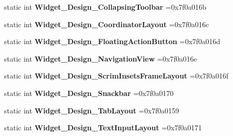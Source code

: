 \begin{DoxyCompactItemize}
\mbox{\label{classandroid_1_1support_1_1v4_1_1R_1_1style_ac57ef044d125ca308bc8647a7d2d7271}} 
static int {\bfseries Widget\+\_\+\+Design\+\_\+\+Collapsing\+Toolbar} =0x7f0a016b
\item 
\mbox{\label{classandroid_1_1support_1_1v4_1_1R_1_1style_a01fd29e23dfab7747aa364b180c1c86d}} 
static int {\bfseries Widget\+\_\+\+Design\+\_\+\+Coordinator\+Layout} =0x7f0a016c
\item 
\mbox{\label{classandroid_1_1support_1_1v4_1_1R_1_1style_a96bc24fc3922c9f6fa34b8385a12de4c}} 
static int {\bfseries Widget\+\_\+\+Design\+\_\+\+Floating\+Action\+Button} =0x7f0a016d
\item 
\mbox{\label{classandroid_1_1support_1_1v4_1_1R_1_1style_ab64857f6ead61a358bb273b4f53f3727}} 
static int {\bfseries Widget\+\_\+\+Design\+\_\+\+Navigation\+View} =0x7f0a016e
\item 
\mbox{\label{classandroid_1_1support_1_1v4_1_1R_1_1style_ab1b53106295abac9313ff0c592e167dd}} 
static int {\bfseries Widget\+\_\+\+Design\+\_\+\+Scrim\+Insets\+Frame\+Layout} =0x7f0a016f
\item 
\mbox{\label{classandroid_1_1support_1_1v4_1_1R_1_1style_a4401c36a52bb3961196c5e8c15cc4518}} 
static int {\bfseries Widget\+\_\+\+Design\+\_\+\+Snackbar} =0x7f0a0170
\item 
\mbox{\label{classandroid_1_1support_1_1v4_1_1R_1_1style_a22d0d627178bb05bb117901b3e3cb3c1}} 
static int {\bfseries Widget\+\_\+\+Design\+\_\+\+Tab\+Layout} =0x7f0a0159
\item 
\mbox{\label{classandroid_1_1support_1_1v4_1_1R_1_1style_ad41e70f321536069c66b856b2e8784d4}} 
static int {\bfseries Widget\+\_\+\+Design\+\_\+\+Text\+Input\+Layout} =0x7f0a0171
\item 
\mbox{\label{classandroid_1_1support_1_1v4_1_1R_1_1style_a9707242edf586794fe0dbc215544fb79}} 

\end{DoxyCompactItemize}
